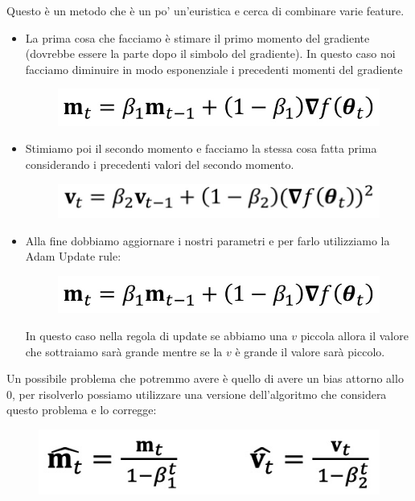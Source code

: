 \documentclass[14pt]{extreport}
\begin{document}
Questo è un metodo che è un po' un'euristica e cerca di combinare varie feature.

\begin{itemize}
	\item La prima cosa che facciamo è stimare il primo momento del gradiente (dovrebbe essere la parte dopo il simbolo del gradiente). In questo caso
	      noi facciamo diminuire in modo esponenziale i precedenti momenti del gradiente\begin{figure}[H]
		      \centering
		      \includegraphics[width=0.7\linewidth]{251.jpeg}
	      \end{figure}
	\item Stimiamo poi il secondo momento e facciamo la stessa cosa fatta prima considerando i precedenti valori del secondo momento.
	\begin{figure}[H]
		      \centering
		      \includegraphics[width=0.7\linewidth]{252.jpeg}
	      \end{figure}
	\item Alla fine dobbiamo aggiornare i nostri parametri e per farlo utilizziamo la Adam Update rule:\begin{figure}[H]
		      \centering
		      \includegraphics[width=0.7\linewidth]{253.jpeg}
	      \end{figure} In questo caso nella regola di update se abbiamo una $v$ piccola allora il valore che sottraiamo sarà grande mentre se la $v$ è
	      grande il valore sarà piccolo.
\end{itemize}

Un possibile problema che potremmo avere è quello di avere un bias attorno allo 0, per risolverlo possiamo utilizzare una versione dell'algoritmo che
considera questo problema e lo corregge:

\begin{figure}[H]
	\centering
	\includegraphics[width=0.5\linewidth]{255.jpeg}
\end{figure}
\end{document}
